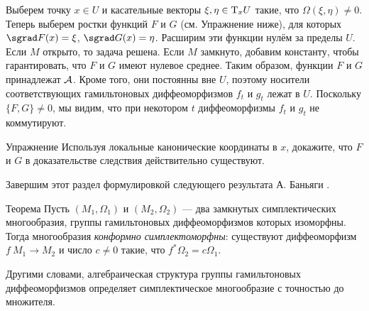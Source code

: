 Выберем точку $x\in U$ и касательные векторы $\xi, \eta \in \mathrm{T}_x U$ такие, что $\Omega (\xi, \eta) \ne 0$.
Теперь выберем ростки функций $F$ и $G$ (см. Упражнение ниже), для которых $\sgrad F (x) = \xi$, $\sgrad G (x) = \eta$.
Расширим эти функции нулём за пределы $U$.
Если $M$ открыто, то задача решена.
Если $M$ замкнуто, добавим константу, чтобы гарантировать, что $F$ и $G$ имеют нулевое среднее.
Таким образом, функции $F$ и $G$ принадлежат $\mathcal{A}$.
Кроме того, они постоянны вне $U$, поэтому носители соответствующих гамильтоновых диффеоморфизмов $f_t$ и $g_t$ лежат в $U$.
Поскольку $\{F, G\} \ne 0$, мы видим, что при некотором $t$ диффеоморфизмы $f_t$ и $g_t$ не коммутируют.
\qeds

\begin{ex*}{Упражнение}
Используя локальные канонические координаты в $x$, докажите, что $F$ и $G$ в доказательстве следствия действительно существуют.
\end{ex*}

Завершим этот раздел формулировкой следующего результата А. Баньяги \cite{B2}.

\begin{thm}{Теорема}\label{1.5.D}
Пусть $(M_1, \Omega_1)$ и $(M_2, \Omega_2)$ — два замкнутых симплектических многообразия, группы гамильтоновых диффеоморфизмов которых изоморфны.
Тогда многообразия \emph{конформно симплектоморфны}: существуют диффеоморфизм $f\: M_1 \to  M_2$ и число $c \ne 0$ такие, что $f^\ast \Omega_2 = c\Omega_1$. 
\end{thm}

Другими словами, алгебраическая структура группы гамильтоновых диффеоморфизмов определяет симплектическое многообразие с точностью до множителя.




